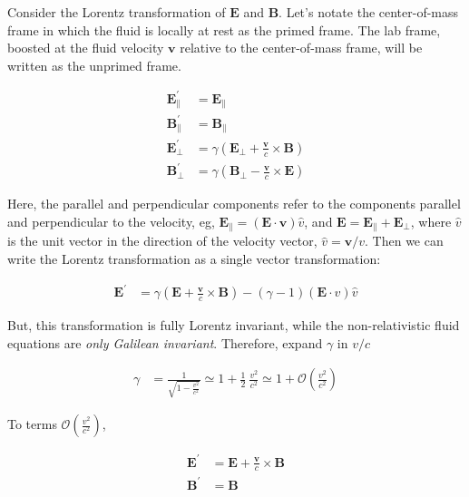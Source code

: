 \documentclass[notoc]{tufte-handout}
\renewcommand{\vec}[1]{
\mathbf{#1}
}
\newcommand{\del}{
\vec{\nabla}
}
\newcommand{\E}{
\vec{E}
}
\newcommand{\B}{
\vec{B}
}
\begin{document}

Consider the Lorentz transformation of $\E$ and  $\B$. Let's notate the center-of-mass frame in which the fluid is locally at rest as the primed frame. The lab frame, boosted at the fluid velocity $ \vec {v}$ relative to the center-of-mass frame, will be written as the unprimed frame.

\begin{align}
\E_{\parallel}^{\prime} & = \E_{\parallel} \\
\B_{\parallel}^{\prime} & = \B_{\parallel} \\
\E_{\bot}^{\prime} & = \gamma \left( \E_\bot + \frac{\vec{v}}{c} 
\times \B  \right) \\
\B_{\bot}^{\prime} & = \gamma \left( \B_\bot - \frac{\vec{v}}{c} \times \E  \right)
\end{align}

Here, the parallel and perpendicular components refer to the components parallel and perpendicular to the velocity, eg,  $\E_\parallel = (\E \cdot \vec{v})\hat {v}$, and $\E = \E_\parallel + \E_\bot$, where $\hat {v}$ is the unit vector in the direction of the velocity vector, $\hat {v} = \vec {v} / v$.  Then we can write the Lorentz transformation as a single vector transformation:

\begin{align}
\E^\prime & = \gamma \left( \E + \frac{\vec{v}}{c} 
\times \B  \right) - (\gamma - 1) \left(\E \cdot \hat {v}   \right) \hat{v} %
\end{align}
%


But, this transformation is fully Lorentz invariant, while the non-relativistic fluid equations are {\it only Galilean invariant}. Therefore, expand $\gamma$ in $v/c$

\begin{align}
    \gamma & = \frac{1}{\sqrt{1-\frac{v^2}{c^2}}} \simeq 1 + \frac{1}{2} ~ \frac{v^2}{c^2} \simeq 1 + \mathcal{O}\left(\frac{v^2}{c^2}\right)
\end{align}

To terms $\mathcal{O}\left(\frac{v^2}{c^2}\right)$,

\begin{align}
    \E^\prime & = \E + \frac{\vec{v}}{c} \times \B  \\
    \B^\prime & = \B 
\end{align}
\end{document}
